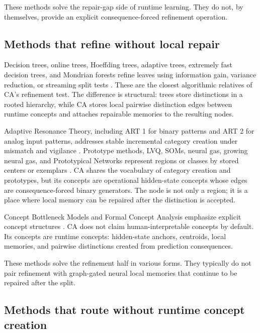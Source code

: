 These methods solve the repair-gap side of runtime learning. They do not, by themselves, provide an explicit consequence-forced refinement operation.

\subsection{Methods that refine without local repair}

Decision trees, online trees, Hoeffding trees, adaptive trees, extremely fast decision trees, and Mondrian forests refine leaves using information gain, variance reduction, or streaming split tests \citep{quinlan1986induction,breiman1984classification,domingos2000mining,bifet2009adaptive,manapragada2018extremely,lakshminarayanan2014mondrian}. These are the closest algorithmic relatives of CA's refinement test. The difference is structural: trees store distinctions in a rooted hierarchy, while CA stores local pairwise distinction edges between runtime concepts and attaches repairable memories to the resulting nodes.

Adaptive Resonance Theory, including ART 1 for binary patterns and ART 2 for analog input patterns, addresses stable incremental category creation under mismatch and vigilance \citep{carpenter1987massively,carpenter1987art2,grossberg2013adaptive}. Prototype methods, LVQ, SOMs, neural gas, growing neural gas, and Prototypical Networks represent regions or classes by stored centers or exemplars \citep{kohonen1990self,kohonen1995self,martinetz1991neural,fritzke1995growing,snell2017prototypical}. CA shares the vocabulary of category creation and prototypes, but its concepts are operational hidden-state concepts whose edges are consequence-forced binary generators. The node is not only a region; it is a place where local memory can be repaired after the distinction is accepted.

Concept Bottleneck Models and Formal Concept Analysis emphasize explicit concept structures \citep{koh2020concept,ganter1999formal}. CA does not claim human-interpretable concepts by default. Its concepts are runtime concepts: hidden-state anchors, centroids, local memories, and pairwise distinctions created from prediction consequences.

These methods solve the refinement half in various forms. They typically do not pair refinement with graph-gated neural local memories that continue to be repaired after the split.

\subsection{Methods that route without runtime concept creation}

